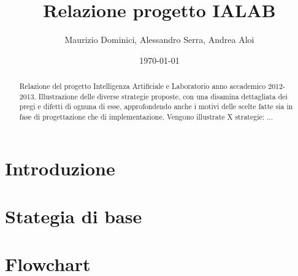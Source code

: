 \documentclass[a4paper,12pt]{report}
\title{Relazione progetto IALAB}
\author{Maurizio Dominici, Alessandro Serra, Andrea Aloi}
\date{\today}
\begin{document}
\maketitle
 
\begin{abstract}
Relazione del progetto Intelligenza Artificiale e Laboratorio anno accademico 2012-2013.
Illustrazione delle diverse strategie proposte, con una disamina dettagliata dei pregi e difetti di ognuna di esse, approfondendo anche i motivi delle scelte fatte sia in fase di progettazione che di implementazione. Vengono illustrate X strategie: ...
\end{abstract}

\newpage
 
\tableofcontents
\clearpage{\pagestyle{empty}\cleardoublepage}

\chapter{Introduzione} \label{cap:intro}


\chapter{Stategia di base} \label{cap:base}


\chapter{Flowchart} \label{cap:flowchart}

\end{document}
